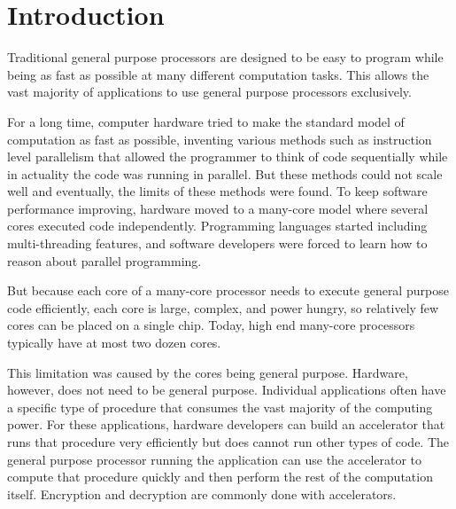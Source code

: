 \documentclass[12pt,twoside]{reedthesis}
\begin{document}



\chapter*{Introduction}
\lstset{language=C++}


		Traditional general purpose processors are designed to be easy to program while being as fast as possible at many different computation tasks. This allows the vast majority of applications to use general purpose processors exclusively. 
		
		For a long time, computer hardware tried to make the standard model of computation as fast as possible, inventing various methods such as instruction level parallelism that allowed the programmer to think of code sequentially while in actuality the code was running in parallel.
		But these methods could not scale well and eventually, the limits of these methods were found. To keep software performance improving, hardware moved to a many-core model where several cores executed code independently. Programming languages started including multi-threading features, and software developers were forced to learn how to reason about parallel programming. 
		
		But because each core of a many-core processor needs to execute general purpose code efficiently, each core is large, complex, and power hungry, so relatively few cores can be placed on a single chip. Today, high end many-core processors typically have at most two dozen cores. 
		
		This limitation was caused by the cores being general purpose. Hardware, however, does not need to be general purpose. 
		Individual applications often have a specific type of procedure that consumes the vast majority of the computing power. For these applications, hardware developers can build an accelerator that runs that procedure very efficiently but does cannot run other types of code. The general purpose processor running the application can use the accelerator to compute that procedure quickly and then perform the rest of the computation itself. Encryption and decryption are commonly done with accelerators. 
		
\end{document}
